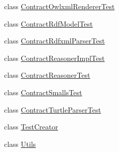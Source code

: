 \begin{DoxyCompactItemize}
class \hyperlink{classorg_1_1semanticweb_1_1owlapi_1_1contract_1_1_contract_owlxml_renderer_test}{Contract\-Owlxml\-Renderer\-Test}
\item 
class \hyperlink{classorg_1_1semanticweb_1_1owlapi_1_1contract_1_1_contract_rdf_model_test}{Contract\-Rdf\-Model\-Test}
\item 
class \hyperlink{classorg_1_1semanticweb_1_1owlapi_1_1contract_1_1_contract_rdfxml_parser_test}{Contract\-Rdfxml\-Parser\-Test}
\item 
class \hyperlink{classorg_1_1semanticweb_1_1owlapi_1_1contract_1_1_contract_reasoner_impl_test}{Contract\-Reasoner\-Impl\-Test}
\item 
class \hyperlink{classorg_1_1semanticweb_1_1owlapi_1_1contract_1_1_contract_reasoner_test}{Contract\-Reasoner\-Test}
\item 
class \hyperlink{classorg_1_1semanticweb_1_1owlapi_1_1contract_1_1_contract_smalls_test}{Contract\-Smalls\-Test}
\item 
class \hyperlink{classorg_1_1semanticweb_1_1owlapi_1_1contract_1_1_contract_turtle_parser_test}{Contract\-Turtle\-Parser\-Test}
\item 
class \hyperlink{classorg_1_1semanticweb_1_1owlapi_1_1contract_1_1_test_creator}{Test\-Creator}
\item 
class \hyperlink{classorg_1_1semanticweb_1_1owlapi_1_1contract_1_1_utils}{Utils}
\end{DoxyCompactItemize}

